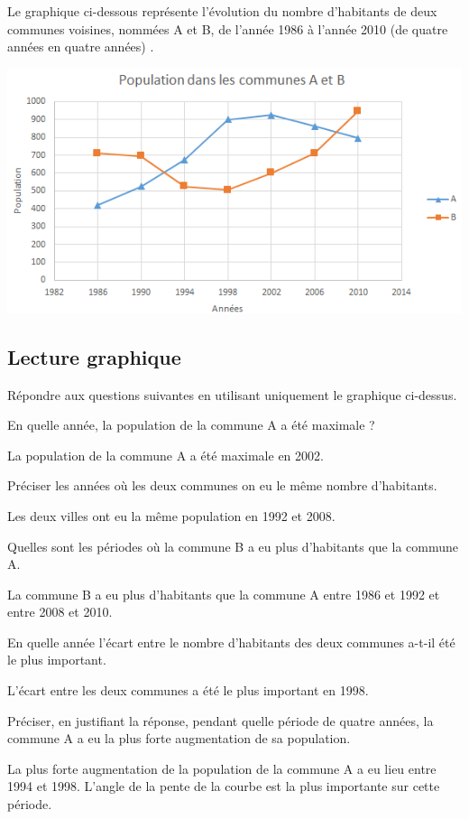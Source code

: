 \documentclass[a4paper,11pt]{exam}
\begin{document}
	
	Le graphique ci-dessous représente l'évolution du nombre d'habitants de deux communes voisines, nommées A et B, de l'année 1986 à l'année 2010 (de quatre années en quatre années) .
	
	\begin{center}
		\includegraphics[scale=0.7]{./graph}
	\end{center}


\subsection{Lecture graphique}				

Répondre aux questions suivantes en utilisant uniquement le graphique ci-dessus.

\begin{questions}
	\question En quelle année, la population de la commune A a été maximale ?
	\begin{solution}
		La population de la commune A a été maximale en 2002.
	\end{solution}
	
	\question Préciser les années où les deux communes on eu le même nombre d'habitants.
	\begin{solution}
		Les deux villes ont eu la même population en 1992 et 2008.
	\end{solution}
	
	\question Quelles sont les périodes où la commune B a eu plus d'habitants que la commune A.
	\begin{solution}
		La commune B a eu plus d'habitants que la commune A entre 1986 et 1992 et entre 2008 et 2010.
	\end{solution}
	
	\question En quelle année l'écart entre le nombre d'habitants des deux communes a-t-il été le plus important.
	\begin{solution}
		L'écart entre les deux communes a été le plus important en 1998.
	\end{solution}
	
	\question Préciser, en justifiant la réponse, pendant quelle période de quatre années, la commune A a eu la plus forte augmentation de sa population.
	\begin{solution}
		La plus forte augmentation de la population de la commune A a eu lieu entre 1994 et 1998. L'angle de la pente de la courbe est la plus importante sur cette période.
	\end{solution}
\end{questions}
\end{document}
